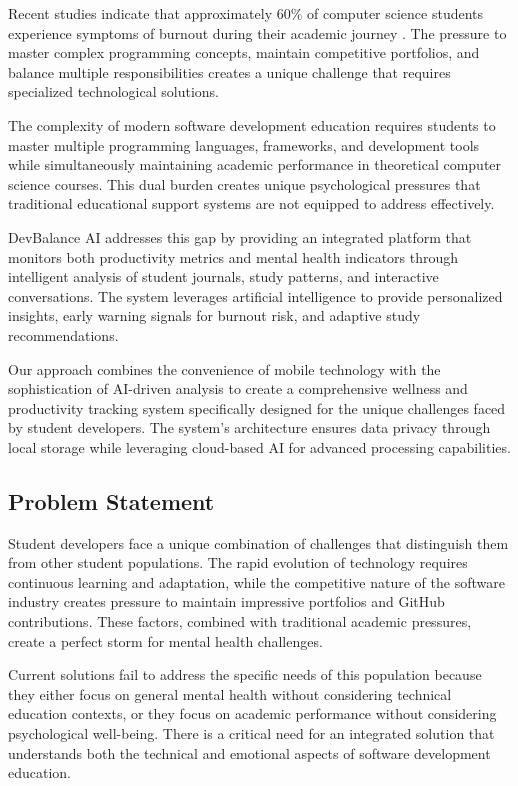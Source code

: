 \documentclass[conference,10pt]{IEEEtran}
\begin{document}
Recent studies indicate that approximately 60\% of computer science students experience symptoms of burnout during their academic journey \cite{brown2021}. The pressure to master complex programming concepts, maintain competitive portfolios, and balance multiple responsibilities creates a unique challenge that requires specialized technological solutions.

The complexity of modern software development education requires students to master multiple programming languages, frameworks, and development tools while simultaneously maintaining academic performance in theoretical computer science courses. This dual burden creates unique psychological pressures that traditional educational support systems are not equipped to address effectively.

DevBalance AI addresses this gap by providing an integrated platform that monitors both productivity metrics and mental health indicators through intelligent analysis of student journals, study patterns, and interactive conversations. The system leverages artificial intelligence to provide personalized insights, early warning signals for burnout risk, and adaptive study recommendations.

Our approach combines the convenience of mobile technology with the sophistication of AI-driven analysis to create a comprehensive wellness and productivity tracking system specifically designed for the unique challenges faced by student developers. The system's architecture ensures data privacy through local storage while leveraging cloud-based AI for advanced processing capabilities.

\subsection{Problem Statement}

Student developers face a unique combination of challenges that distinguish them from other student populations. The rapid evolution of technology requires continuous learning and adaptation, while the competitive nature of the software industry creates pressure to maintain impressive portfolios and GitHub contributions. These factors, combined with traditional academic pressures, create a perfect storm for mental health challenges.

Current solutions fail to address the specific needs of this population because they either focus on general mental health without considering technical education contexts, or they focus on academic performance without considering psychological well-being. There is a critical need for an integrated solution that understands both the technical and emotional aspects of software development education.
\end{document}
